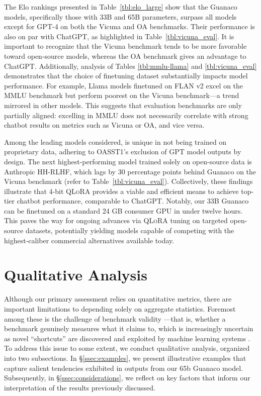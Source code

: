 The Elo rankings presented in Table~\ref{tbl:elo_large} show that the {Guanaco} models, specifically those with 33B and 65B parameters, surpass all models except for GPT-4 on both the Vicuna and OA benchmarks. Their performance is also on par with ChatGPT, as highlighted in Table~\ref{tbl:vicuna_eval}. It is important to recognize that the Vicuna benchmark tends to be more favorable toward open-source models, whereas the OA benchmark gives an advantage to ChatGPT. Additionally, analysis of Tables \ref{tbl:mmlu-llama} and \ref{tbl:vicuna_eval} demonstrates that the choice of finetuning dataset substantially impacts model performance. For example, Llama models finetuned on FLAN v2 excel on the MMLU benchmark but perform poorest on the Vicuna benchmark—a trend mirrored in other models. This suggests that evaluation benchmarks are only partially aligned: excelling in MMLU does not necessarily correlate with strong chatbot results on metrics such as Vicuna or OA, and vice versa.

Among the leading models considered,  is unique in not being trained on proprietary data, adhering to OASST1's exclusion of GPT model outputs by design. The next highest-performing model trained solely on open-source data is Anthropic HH-RLHF, which lags by 30 percentage points behind {Guanaco} on the Vicuna benchmark (refer to Table~\ref{tbl:vicuna_eval}). Collectively, these findings illustrate that 4-bit \textsc{QLoRA} provides a viable and efficient means to achieve top-tier chatbot performance, comparable to ChatGPT. Notably, our 33B {Guanaco} can be finetuned on a standard 24 GB consumer GPU in under twelve hours. This paves the way for ongoing advances via \textsc{QLoRA} tuning on targeted open-source datasets, potentially yielding models capable of competing with the highest-caliber commercial alternatives available today.

\section{Qualitative Analysis}

Although our primary assessment relies on quantitative metrics, there are important limitations to depending solely on aggregate statistics. Foremost among these is the challenge of benchmark validity \citep{liao2021we}—that is, whether a benchmark genuinely measures what it claims to, which is increasingly uncertain as novel ``shortcuts'' are discovered and exploited by machine learning systems \citep{gururangan2018annotation, poliak2018hypothesis}. To address this issue to some extent, we conduct qualitative analysis, organized into two subsections. In \S\ref{ssec:examples}, we present illustrative examples that capture salient tendencies exhibited in outputs from our 65b {Guanaco} model. Subsequently, in \S\ref{ssec:considerations}, we reflect on key factors that inform our interpretation of the results previously discussed.

